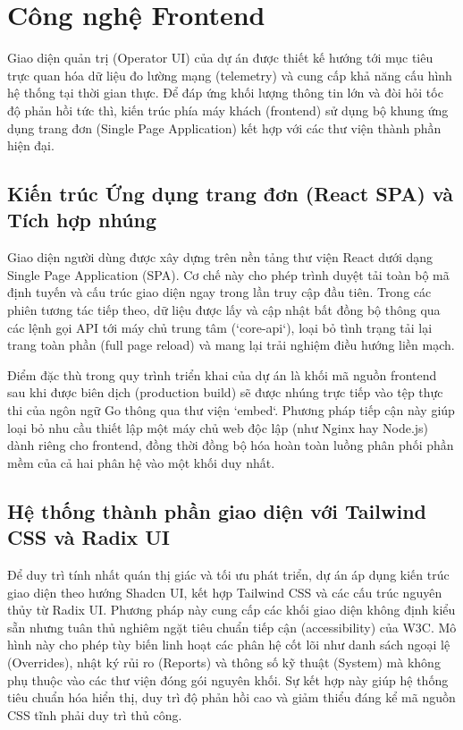 \section{Công nghệ Frontend}

Giao diện quản trị (Operator UI) của dự án được thiết kế hướng tới mục tiêu trực quan hóa dữ liệu đo lường mạng (telemetry) và cung cấp khả năng cấu hình hệ thống tại thời gian thực. Để đáp ứng khối lượng thông tin lớn và đòi hỏi tốc độ phản hồi tức thì, kiến trúc phía máy khách (frontend) sử dụng bộ khung ứng dụng trang đơn (Single Page Application) kết hợp với các thư viện thành phần hiện đại.

\subsection{Kiến trúc Ứng dụng trang đơn (React SPA) và Tích hợp nhúng}
Giao diện người dùng được xây dựng trên nền tảng thư viện React dưới dạng Single Page Application (SPA). Cơ chế này cho phép trình duyệt tải toàn bộ mã định tuyến và cấu trúc giao diện ngay trong lần truy cập đầu tiên. Trong các phiên tương tác tiếp theo, dữ liệu được lấy và cập nhật bất đồng bộ thông qua các lệnh gọi API tới máy chủ trung tâm (`core-api`), loại bỏ tình trạng tải lại trang toàn phần (full page reload) và mang lại trải nghiệm điều hướng liền mạch. 

Điểm đặc thù trong quy trình triển khai của dự án là khối mã nguồn frontend sau khi được biên dịch (production build) sẽ được nhúng trực tiếp vào tệp thực thi của ngôn ngữ Go thông qua thư viện `embed`. Phương pháp tiếp cận này giúp loại bỏ nhu cầu thiết lập một máy chủ web độc lập (như Nginx hay Node.js) dành riêng cho frontend, đồng thời đồng bộ hóa hoàn toàn luồng phân phối phần mềm của cả hai phân hệ vào một khối duy nhất.

\subsection{Hệ thống thành phần giao diện với Tailwind CSS và Radix UI}
Để duy trì tính nhất quán thị giác và tối ưu phát triển, dự án áp dụng kiến trúc giao diện theo hướng Shadcn UI, kết hợp Tailwind CSS và các cấu trúc nguyên thủy từ Radix UI. Phương pháp này cung cấp các khối giao diện không định kiểu sẵn nhưng tuân thủ nghiêm ngặt tiêu chuẩn tiếp cận (accessibility) của W3C. Mô hình này cho phép tùy biến linh hoạt các phân hệ cốt lõi như danh sách ngoại lệ (Overrides), nhật ký rủi ro (Reports) và thông số kỹ thuật (System) mà không phụ thuộc vào các thư viện đóng gói nguyên khối. Sự kết hợp này giúp hệ thống tiêu chuẩn hóa hiển thị, duy trì độ phản hồi cao và giảm thiểu đáng kể mã nguồn CSS tĩnh phải duy trì thủ công.

